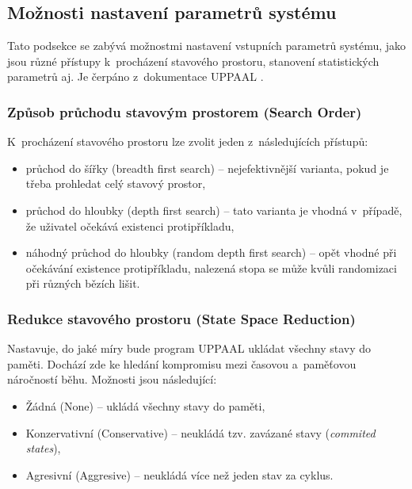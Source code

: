 \subsection{Možnosti nastavení parametrů systému}
Tato podsekce se zabývá možnostmi nastavení vstupních parametrů systému, jako jsou různé přístupy k~procházení stavového prostoru, stanovení statistických parametrů aj. Je čerpáno z~dokumentace UPPAAL \cite{uppaal_doc}.

\subsubsection{Způsob průchodu stavovým prostorem (Search Order)}
K~procházení stavového prostoru lze zvolit jeden z~následujících přístupů:
\begin{itemize}
    \item průchod do šířky (breadth first search) -- nejefektivnější varianta, pokud je třeba prohledat celý stavový prostor,
    \item průchod do hloubky (depth first search) -- tato varianta je vhodná v~případě, že uživatel očekává existenci protipříkladu,
    \item náhodný průchod do hloubky (random depth first search) -- opět vhodné při očekávání existence protipříkladu, nalezená stopa se může kvůli randomizaci při různých bězích lišit.
\end{itemize}

\subsubsection{Redukce stavového prostoru (State Space Reduction)}
Nastavuje, do jaké míry bude program UPPAAL ukládat všechny stavy do paměti. Dochází zde ke hledání kompromisu mezi časovou a~paměťovou náročností běhu. Možnosti jsou následující:
\begin{itemize}
    \item Žádná (None) -- ukládá všechny stavy do paměti,
    \item Konzervativní (Conservative) -- neukládá tzv. zavázané stavy (\textit{commited states}),
    \item Agresivní (Aggresive) -- neukládá více než jeden stav za cyklus.
\end{itemize}

